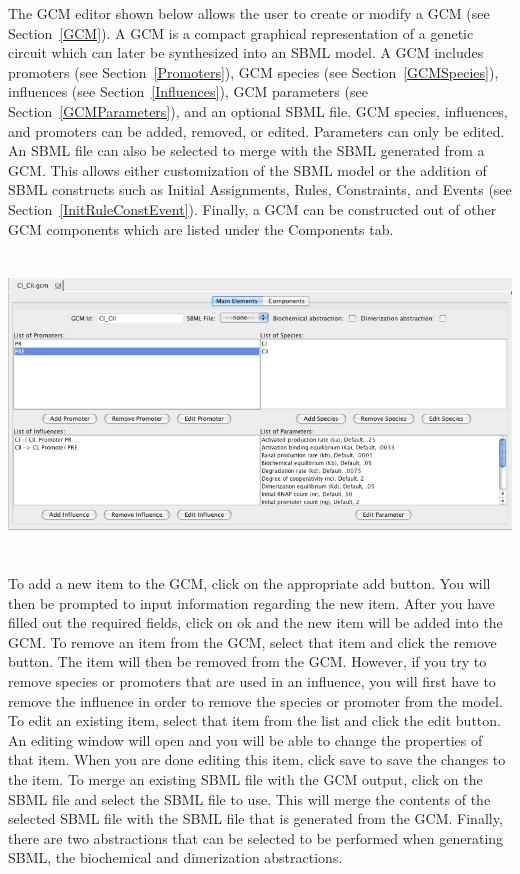 \documentclass[titlepage,11pt]{article}
\begin{document}
\noindent
The GCM editor shown below allows the user to create or modify a GCM 
(see Section~\ref{GCM}).  A GCM is a compact graphical representation 
of a genetic circuit which can later be synthesized into an SBML model. 
A GCM includes promoters (see Section~\ref{Promoters}),
GCM species (see Section~\ref{GCMSpecies}), 
influences (see Section~\ref{Influences}), 
GCM parameters (see Section~\ref{GCMParameters}), and an optional
SBML file.  GCM species, influences, 
and promoters can be added, removed, or edited. Parameters can only be edited. 
An SBML file can also be selected to merge with the SBML generated from a GCM.
This allows either customization of the SBML model or the addition of SBML
constructs such as Initial Assignments, Rules, Constraints, 
and Events (see Section~\ref{InitRuleConstEvent}).  Finally, a GCM can
be constructed out of other GCM components which are listed under the
Components tab.
\begin{center}
\includegraphics[height=80mm]{screenshots/GCMedit}
\end{center}

To add a new item to the GCM, click on the appropriate add button. You
will then be prompted to input information regarding the new
item. After you have filled out the required fields, click on ok
and the new item will be added into the GCM.
To remove an item from the GCM, select that item and click the
remove button. The item will then be removed from the GCM.
However, if you try to remove species or promoters that are used in
an influence, you will first have to remove the influence in
order to remove the species or promoter from the model.
To edit an existing item, select that item from the list and
click the edit button. An editing window will open and you will
be able to change the properties of that item. When you are done
editing this item, click save to save the changes to the item. 
To merge an existing SBML file with the GCM output, click on
the SBML file and select the SBML file to use. This will merge
the contents of the selected SBML file with the SBML file that is 
generated from the GCM.  Finally, there are two abstractions that can
be selected to be performed when generating SBML, the biochemical and
dimerization abstractions.
\end{document}
